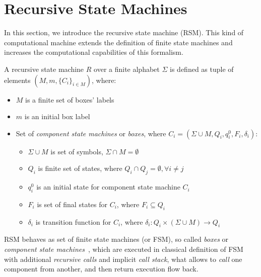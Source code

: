 \section{Recursive State Machines}

In this section, we introduce the recursive state machine (RSM). This kind of computational machine extends the definition of finite state machines and increases the computational capabilities of this formalism.

A recursive state machine $R$ over a finite alphabet $\Sigma$ is defined as tuple of elements $(M,m,\{C_i\}_{i \in M})$, where:

\begin{itemize}
    \item $M$ is a finite set of boxes' labels
    \item $m$ is an initial box label
    \item Set of \textit{component state machines} or \textit{boxes}, 
          where $C_i=(\Sigma \cup M, Q_i,q_i^0,F_i,\delta_i)$:
    \begin{itemize}
        \item $\Sigma \cup M$ is set of symbols, $\Sigma \cap M = \emptyset$
        \item $Q_i$ is finite set of states, 
              where $Q_i \cap Q_j = \emptyset, \forall i \neq j$
        \item $q_i^0$ is an initial state for component state machine $C_i$
        \item $F_i$ is set of final states for $C_i$, where $F_i \subseteq Q_i$
        \item $\delta_i$ is transition function for $C_i$, 
              where $\delta_i: Q_i \times (\Sigma \cup M) 
              \to Q_i$
    \end{itemize}
\end{itemize}

RSM behaves as set of finite state machines (or FSM), so called \textit{boxes} or \textit{component state machines}~\cite{rsm:analysis:10.1007/3-540-44585-4_18}, which are executed in classical definition of  FSM with additional \textit{recursive calls} and implicit \textit{call stack}, what allows to \textit{call} one component from another, and then return execution flow back.



